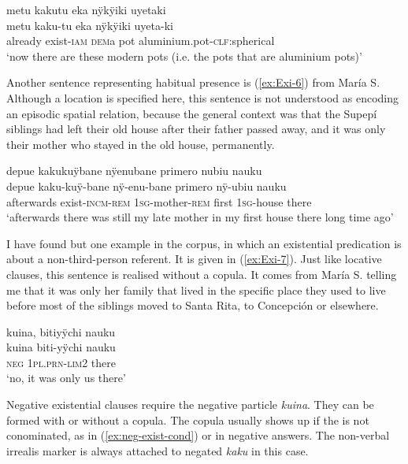 \ea\label{ex:exist-tu}
\begingl 
\glpreamble metu kakutu eka nÿkÿiki uyetaki\\
\gla metu kaku-tu eka nÿkÿiki uyeta-ki\\ 
\glb already exist-\textsc{iam} \textsc{dem}a pot aluminium.pot-\textsc{clf}:spherical\\ 
\glft ‘now there are these modern pots (i.e. the pots that are aluminium pots)’
\trailingcitation{[jxx-d110923l-2.41]}
\xe

Another sentence representing habitual presence is (\ref{ex:Exi-6}) from María S. Although a location is specified here, this sentence is not understood as encoding an episodic spatial relation, because the general context was that the Supepí siblings had left their old house after their father passed away, and it was only their mother who stayed in the old house, permanently.

\ea\label{ex:Exi-6}
\begingl
\glpreamble depue kakukuÿbane nÿenubane primero nubiu nauku\\
\gla depue kaku-kuÿ-bane nÿ-enu-bane primero nÿ-ubiu nauku\\
\glb afterwards exist-\textsc{incm}-\textsc{rem} 1\textsc{sg}-mother-\textsc{rem} first 1\textsc{sg}-house there\\
\glft ‘afterwards there was still my late mother in my first house there long time ago’
\endgl
\trailingcitation{[rxx-e120511l.172]}
\xe

I have found but one example in the corpus, in which an existential predication is about a non-third-person referent. It is given in (\ref{ex:Exi-7}). Just like locative clauses, this sentence is realised without a copula. It comes from María S. telling me that it was only her family that lived in the specific place they used to live before most of the siblings moved to Santa Rita, to Concepción or elsewhere.

\ea\label{ex:Exi-7}
\begingl
\glpreamble kuina, bitiyÿchi nauku\\
\gla kuina biti-yÿchi nauku\\
\glb \textsc{neg} 1\textsc{pl.prn}-\textsc{lim}2 there\\
\glft ‘no, it was only us there’
\endgl
\trailingcitation{[rxx-p181101l-2.130]}
\xe

Negative existential clauses require the negative particle \textit{kuina}. They can be formed with or without a copula. The copula usually shows up if the  is not conominated, as in (\ref{ex:neg-exist-cond}) or in negative answers. The non-verbal irrealis marker is always attached to negated \textit{kaku} in this case.

